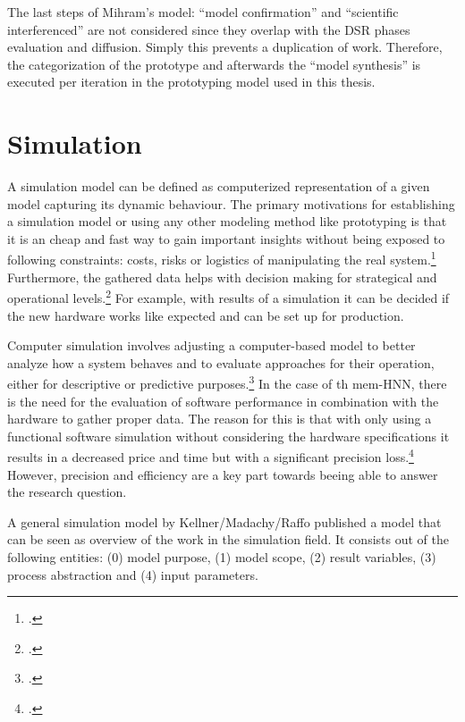 The last steps of Mihram's model: ``model confirmation'' and ``scientific interferenced'' are not considered since they overlap with the \ac{DSR} phases evaluation and diffusion. 
Simply this prevents a duplication of work.
Therefore, the categorization of the prototype and afterwards the ``model synthesis'' is executed per iteration in the prototyping model used in this thesis. 

\section{Simulation}

A simulation model can be defined as computerized representation of a given model capturing its dynamic behaviour.
The primary motivations for establishing a simulation model or using any other modeling method like prototyping is that it is
an cheap and fast way to gain important insights without being exposed to following constraints: costs, risks or logistics of manipulating the real system.\footcite[cf.][92]{kellnerSoftwareProcessSimulation1999}
Furthermore, the gathered data helps with decision making for strategical and operational levels.\footcite[cf.][93]{kellnerSoftwareProcessSimulation1999}
For example, with results of a simulation it can be decided if the new hardware works like expected and can be set up for production.

Computer simulation involves adjusting a computer-based model to better analyze how a system behaves and to evaluate approaches for their operation, either for descriptive or predictive purposes.\footcite[cf.][13-14]{abarAgentBasedModelling2017}
In the case of th \ac{mem-HNN}, there is the need for the evaluation of software performance in combination with the hardware to gather proper data.
The reason for this is that with only using a functional software simulation without considering the hardware specifications it results in a decreased price and time but with a significant precision loss.\footcite[cf.][470-471]{sarhadiStateArtHardware2015}
However, precision and efficiency are a key part towards beeing able to answer the research question.

A general simulation model by Kellner/Madachy/Raffo published a model that can be seen as overview of the work in the simulation field.
It consists out of the following entities: (0) model purpose, (1) model scope, (2) result variables, (3) process abstraction and (4) input parameters.  

